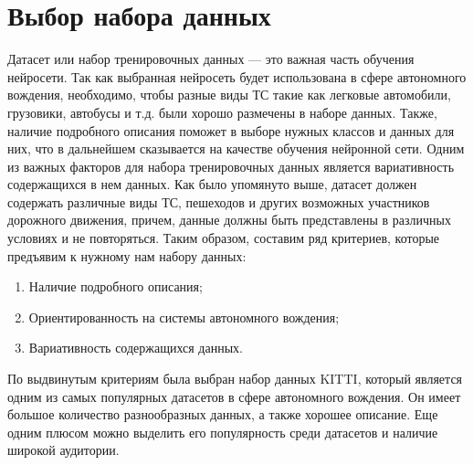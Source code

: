 \section {Выбор набора данных}

Датасет или набор тренировочных данных --- это важная часть обучения нейросети. 
Так как выбранная нейросеть будет использована в сфере автономного вождения, 
необходимо, чтобы разные виды ТС такие как легковые автомобили, грузовики, 
автобусы и т.д. были хорошо размечены в наборе данных. Также, наличие подробного
описания поможет в выборе нужных классов и данных для них, что в дальнейшем
сказывается на качестве обучения нейронной сети. Одним из важных факторов для 
набора тренировочных данных является вариативность содержащихся в нем данных.
Как было упомянуто выше, датасет должен содержать различные виды ТС, пешеходов и 
других возможных участников дорожного движения, причем, данные должны быть представлены
в различных условиях и не повторяться. Таким образом, составим ряд критериев, 
которые предъявим к нужному нам набору данных:

\begin{enumerate}

	\item Наличие подробного описания;
	
	\item Ориентированность на системы автономного вождения;
	
	\item Вариативность содержащихся данных.
	
\end{enumerate}

По выдвинутым критериям была выбран набор данных KITTI, который является одним из самых популярных
датасетов в сфере автономного вождения. Он имеет большое количество разнообразных данных, а также
хорошее описание. Еще одним плюсом можно выделить его популярность среди датасетов и наличие
широкой аудитории.


